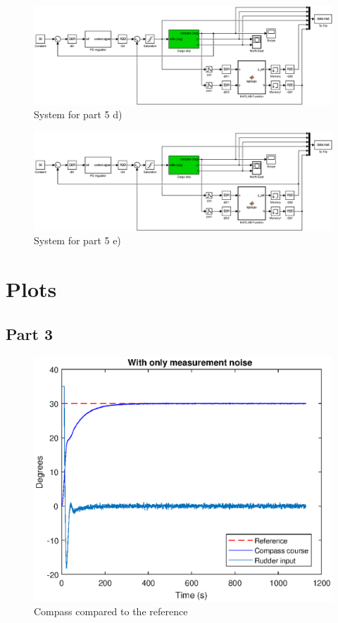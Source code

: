 \begin{figure}[H]
    \begin{center}
    \includegraphics[width=1\linewidth]{Part5_pics/p5p5d.eps}
    \caption{System for part 5 d)}\label{sim:part5d}
    \end{center}
\end{figure}

\begin{figure}[H]
    \begin{center}
    \includegraphics[width=1\linewidth]{Part5_pics/p5p5e.eps}
    \caption{System for part 5 e)}\label{sim:part5e}
    \end{center}
\end{figure}

\newpage
\section{Plots}

\subsection{Part 3}
\begin{figure}[H]
    \centering
    \includegraphics[width=1\linewidth]{Part3_pics/3b.eps}
    \caption{Compass compared to the reference}
    \label{sim:5.3.b}
\end{figure}
